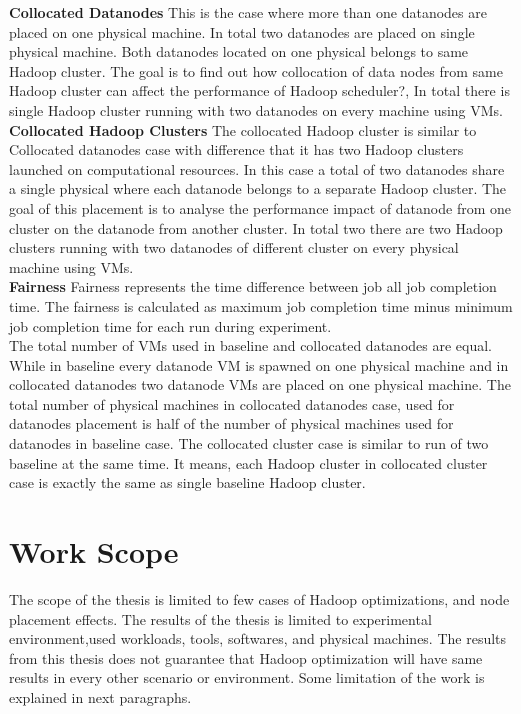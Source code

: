 \textbf{Collocated Datanodes} This is the case where more than one datanodes are placed on one physical machine. In total two datanodes are placed on single physical machine. Both datanodes located on one physical belongs to same Hadoop cluster. The goal is to find out how collocation of data nodes from same Hadoop cluster can affect the performance of Hadoop scheduler?, In total there is single Hadoop cluster running with two datanodes on every machine using VMs. \\
 
\textbf{Collocated Hadoop Clusters } The collocated Hadoop cluster is similar to Collocated datanodes case with difference that it has two Hadoop clusters launched on computational resources. In this case a total of two datanodes share a single physical where each datanode belongs to a separate Hadoop cluster. The goal of this placement is to analyse the performance impact of datanode from one cluster on the datanode from another cluster. In total two there are two Hadoop clusters running  with two datanodes of different cluster on every physical machine using VMs.\\  

\textbf{Fairness } Fairness represents the time difference between job all job completion time. The fairness is calculated as maximum job completion time minus minimum job completion time for each run during experiment. \\

The total number of VMs used in baseline and collocated datanodes are equal. While in baseline every datanode VM is spawned on one physical machine and in collocated datanodes two datanode VMs are placed on one physical machine. The total number of physical machines in collocated datanodes case, used for datanodes placement  is half of the number of physical machines used for datanodes in baseline case. The collocated cluster case is similar to run of two baseline at the same time. It means, each Hadoop cluster in collocated cluster case is exactly the same as single baseline Hadoop cluster.  
  


\section{Work Scope}

The scope of the thesis is limited to few cases of Hadoop optimizations, and node placement effects. The results of the thesis is limited to experimental environment,used workloads, tools, softwares, and physical machines. The results from this thesis does not guarantee that Hadoop optimization will have same results in every other scenario or environment. Some limitation of the work is explained in next paragraphs. \\

